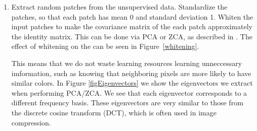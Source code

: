 \documentclass{article} %
\begin{document}
\begin{enumerate}
\item Extract random patches from the unsupervised data. Standardize the patches, so that each patch has mean 0 and standard deviation 1. Whiten the input patches to make the covariance matrix of the each patch approximately the identity matrix. This can be done via PCA or ZCA, as described in \cite{kriz}. The effect of whitening on the can be seen in Figure~\ref{whitening}.

  This means that we do not waste learning resources learning unneccessary imformation, such as knowing that neighboring pixels are more likely to have similar colors.
  In Figure \ref{figEigenvectors} we show the eigenvectors we extract when performing PCA/ZCA. We see that each eigenvector corresponds to a different frequency basis. These eigenvectors are very similar to those from the discrete cosine transform (DCT), which is often used in image compression.


\end{enumerate}
\end{document}
